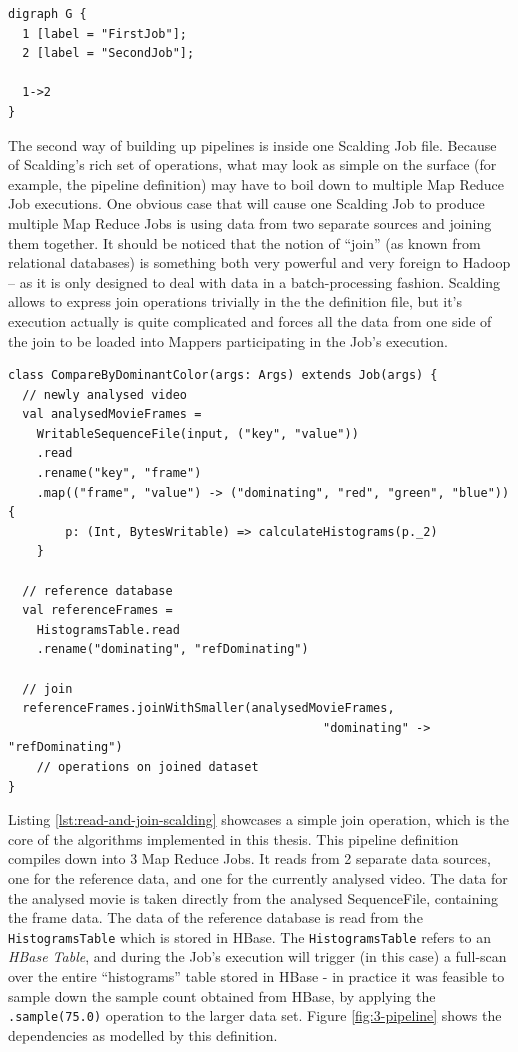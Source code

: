 \begin{lstlisting}[caption={Textual description of graph on Figure \ref{fig:simplest-pipeline}, using the DOT graph description language.}, label={lst:simplest-pipeline-dot}]
digraph G {
  1 [label = "FirstJob"];
  2 [label = "SecondJob"];
  
  1->2
}
\end{lstlisting}

The second way of building up pipelines is inside one Scalding Job file. Because of Scalding's rich set of operations, what may look as simple on the surface (for example, the pipeline definition) may have to boil down to multiple Map Reduce Job executions. One obvious case that will cause one Scalding Job to produce multiple Map Reduce Jobs is using data from two separate sources and joining them together. It should be noticed that the notion of ``join'' (as known from relational databases) is something both very powerful and very foreign to Hadoop -- as it is only designed to deal with data in a batch-processing fashion. Scalding allows to express join operations trivially in the the definition file, but it's execution actually is quite complicated and forces all the data from one side of the join to be loaded into Mappers participating in the Job's execution.

\newpage
\begin{lstlisting}[caption={Scalding job, reading data from 2 sources and joining them on dominantColor, producing 3 Map Reduce Jobs}, label={lst:read-and-join-scalding}]
class CompareByDominantColor(args: Args) extends Job(args) {
  // newly analysed video
  val analysedMovieFrames = 
    WritableSequenceFile(input, ("key", "value"))
    .read
    .rename("key", "frame")
    .map(("frame", "value") -> ("dominating", "red", "green", "blue")) { 
        p: (Int, BytesWritable) => calculateHistograms(p._2)
    }
  
  // reference database
  val referenceFrames = 
    HistogramsTable.read
    .rename("dominating", "refDominating")

  // join
  referenceFrames.joinWithSmaller(analysedMovieFrames, 
                                            "dominating" -> "refDominating")
    // operations on joined dataset
}
\end{lstlisting}

Listing \ref{lst:read-and-join-scalding} showcases a simple join operation, which is the core of the algorithms implemented in this thesis. This pipeline definition compiles down into 3 Map Reduce Jobs. It reads from 2 separate data sources, one for the reference data, and one for the currently analysed video. The data for the analysed movie is taken directly from the analysed SequenceFile, containing the frame data. The data of the reference database is read from the \verb|HistogramsTable| which is stored in HBase. The \verb|HistogramsTable| refers to an \textit{HBase Table}, and during the Job's execution will trigger (in this case) a full-scan over the entire ``histograms'' table stored in HBase - in practice it was feasible to sample down the sample count obtained from HBase, by applying the \verb|.sample(75.0)| operation to the larger data set. Figure \ref{fig:3-pipeline} shows the dependencies as modelled by this definition.

